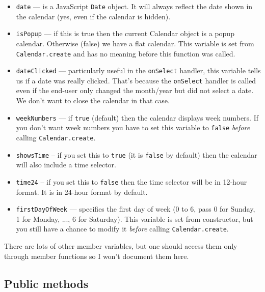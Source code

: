 \documentclass[a4paper,twoside,10pt]{dynadoc}
\begin{document}
\begin{itemize}

\item \texttt{date} --- is a JavaScript \texttt{Date} object.  It will always
reflect the date shown in the calendar (yes, even if the calendar is hidden).

\item \texttt{isPopup} --- if this is true then the current Calendar object is
a popup calendar.  Otherwise (false) we have a flat calendar.  This variable is
set from \texttt{Calendar.create} and has no meaning before this function was
called.

\item \texttt{dateClicked} --- particularly useful in the \texttt{onSelect}
handler, this variable tells us if a date was really clicked.  That's because
the \texttt{onSelect} handler is called even if the end-user only changed the
month/year but did not select a date.  We don't want to close the calendar in
that case.

\item \texttt{weekNumbers} --- if \texttt{true} (default) then the calendar
displays week numbers.  If you don't want week numbers you have to set this
variable to \texttt{false} \emph{before} calling \texttt{Calendar.create}.

\item \texttt{showsTime} -- if you set this to \texttt{true} (it is
\texttt{false} by default) then the calendar will also include a time selector.

\item \texttt{time24} -- if you set this to \texttt{false} then the time
selector will be in 12-hour format.  It is in 24-hour format by default.

\item \texttt{firstDayOfWeek} --- specifies the first day of week (0 to 6, pass
  0 for Sunday, 1 for Monday, ..., 6 for Saturday).  This variable is set from
  constructor, but you still have a chance to modify it \emph{before} calling
  \texttt{Calendar.create}.

\end{itemize}

There are lots of other member variables, but one should access them only
through member functions so I won't document them here.

\subsection{Public methods}
\end{document}
